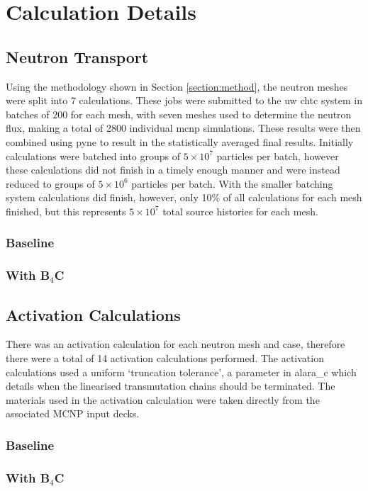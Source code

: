 \documentclass[12pt]{article}
\begin{document}
\section{Calculation Details}
\subsection{Neutron Transport}
Using the methodology shown in Section \ref{section:method}, the neutron meshes
were split into 7 calculations. These jobs were submitted to the \gls{uw}
\gls{chtc} system in batches of 200 for each mesh, with seven meshes used to
determine the neutron flux, making a
total of 2800 individual \gls{mcnp} simulations. These results were then
combined using \gls{pyne} to result in the statistically averaged final results.
Initially calculations were batched into groups of $5\times10^7$ particles per
batch, however these calculations did not finish in a timely enough manner and
were instead reduced to groups of $5\times10^6$ particles per batch. With the
smaller batching system calculations did finish, however, only 10\% of all
calculations for each mesh finished, but this represents $5\times10^7$ total
source histories for each mesh.
\subsubsection{Baseline}
\subsubsection{With B$_4$C}
\subsection{Activation Calculations}
There was an activation calculation for each neutron mesh and case, therefore
there were a total of 14 activation calculations performed. The activation
calculations used a uniform `truncation tolerance', a parameter in \gls{alara_c}
which details when the linearised transmutation chains should be terminated. The
materials used in the activation calculation were taken directly from the 
associated MCNP input decks.
\subsubsection{Baseline}
\subsubsection{With B$_4$C}
\end{document}
